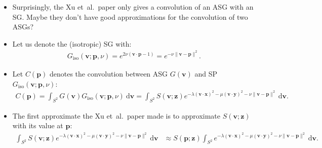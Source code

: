 \documentclass[10pt]{article}
\newcommand{\dee}{\mathrm{d}}
\newcommand{\ve}[1]{\mathbf{#1}}
\newcommand{\etal}{{et~al.}}
\begin{document}
  \begin{itemize}
    \item Surprisingly, the Xu \etal\ paper only gives a convolution of an ASG with an SG.  Maybe they don't have good approximations for the convolution of two ASGs?

    \item Let us denote the (isotropic) SG with:
    \begin{align*}
      G_{\mathrm{iso}}(\ve{v}; \ve{p}, \nu) 
      = e^{2\nu(\ve{v} \cdot \ve{p}-1)}
      = e^{-\nu \|\ve{v} - \ve{p}\|^2}.
    \end{align*}

    \item Let $C(\ve{p})$ denotes the convolution between ASG $G(\ve{v})$ and SP $G_{\mathrm{iso}}(\ve{v}; \ve{p}, \nu)$:
    \begin{align*}
      C(\ve{p}) 
      = \int_{S^2} G(\ve{v}) G_{\mathrm{iso}}(\ve{v}; \ve{p}, \nu)\ \dee\ve{v}
      = \int_{S^2} S(\ve{v}; \ve{z}) e^{-\lambda(\ve{v} \cdot \ve{x})^2 - \mu (\ve{v} \cdot \ve{y})^2 - \nu \| \ve{v} - \ve{p} \|^2}\ \dee\ve{v}.
    \end{align*}

    \item The first approximate the Xu \etal\ paper made is to approximate $S(\ve{v};\ve{z})$ with its value at $\ve{p}$:
    \begin{align*}
      \int_{S^2} S(\ve{v}; \ve{z}) e^{-\lambda(\ve{v} \cdot \ve{x})^2 - \mu (\ve{v} \cdot \ve{y})^2 - \nu \| \ve{v} - \ve{p} \|^2}\ \dee\ve{v}
      &\approx S(\ve{p}; \ve{z}) \int_{S^2} e^{-\lambda(\ve{v} \cdot \ve{x})^2 - \mu (\ve{v} \cdot \ve{y})^2 - \nu \| \ve{v} - \ve{p} \|^2}\ \dee\ve{v}.
    \end{align*}


\end{itemize}
\end{document}
